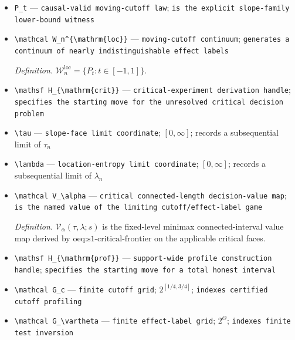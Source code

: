 \documentclass{article}
\begin{document}
\begin{itemize}
  \item \texttt{P\_\allowbreak{}t} --- \texttt{causal-\allowbreak{}valid moving-\allowbreak{}cutoff law}; \texttt{is the explicit slope-\allowbreak{}family lower-\allowbreak{}bound witness}
  \item \texttt{\textbackslash{}\allowbreak{}mathcal W\_\allowbreak{}n\textasciicircum{}\{\textbackslash{}\allowbreak{}mathrm\{loc\}\allowbreak{}\}\allowbreak{}} --- \texttt{moving-\allowbreak{}cutoff continuum}; \texttt{generates a continuum of nearly indistinguishable effect labels}
  \par\smallskip\noindent\emph{Definition.} \(\mathcal W_n^{\mathrm{loc}}=\{P_t:t\in[-1,1]\}\).
  \item \texttt{\textbackslash{}\allowbreak{}mathsf H\_\allowbreak{}\{\textbackslash{}\allowbreak{}mathrm\{crit\}\allowbreak{}\}\allowbreak{}} --- \texttt{critical-\allowbreak{}experiment derivation handle}; \texttt{specifies the starting move for the unresolved critical decision problem}
  \item \texttt{\textbackslash{}\allowbreak{}tau} --- \texttt{slope-\allowbreak{}face limit coordinate}; \([0,\infty]\); records a subsequential limit of \(\tau_n\)
  \item \texttt{\textbackslash{}\allowbreak{}lambda} --- \texttt{location-\allowbreak{}entropy limit coordinate}; \([0,\infty]\); records a subsequential limit of \(\lambda_n\)
  \item \texttt{\textbackslash{}\allowbreak{}mathcal V\_\allowbreak{}\textbackslash{}\allowbreak{}alpha} --- \texttt{critical connected-\allowbreak{}length decision-\allowbreak{}value map}; \texttt{is the named value of the limiting cutoff/\allowbreak{}effect-\allowbreak{}label game}
  \par\smallskip\noindent\emph{Definition.} \(\mathcal V_\alpha(\tau,\lambda;s)\) is the fixed-level minimax connected-interval value map derived by \(\text{oeq:s1-critical-frontier}\) on the applicable critical faces.
  \item \texttt{\textbackslash{}\allowbreak{}mathsf H\_\allowbreak{}\{\textbackslash{}\allowbreak{}mathrm\{prof\}\allowbreak{}\}\allowbreak{}} --- \texttt{support-\allowbreak{}wide profile construction handle}; \texttt{specifies the starting move for a total honest interval}
  \item \texttt{\textbackslash{}\allowbreak{}mathcal G\_\allowbreak{}c} --- \texttt{finite cutoff grid}; \(2^{[1/4,3/4]}\); \texttt{indexes certified cutoff profiling}
  \item \texttt{\textbackslash{}\allowbreak{}mathcal G\_\allowbreak{}\textbackslash{}\allowbreak{}vartheta} --- \texttt{finite effect-\allowbreak{}label grid}; \(2^{\Theta}\); \texttt{indexes finite test inversion}

\end{itemize}
\end{document}
